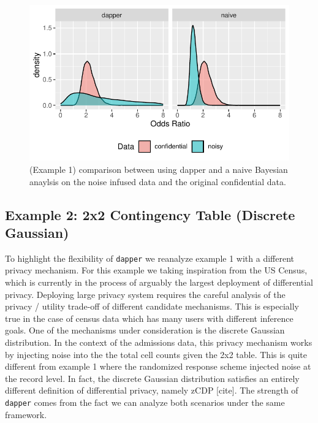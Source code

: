 \begin{figure}

{\centering \includegraphics{dppaper_files/figure-latex/post-or-compare-1} 

}

\caption{(Example 1) comparison between using dapper and a naive Bayesian anaylsis on the
noise infused data and the original confidential data.}\label{fig:post-or-compare}
\end{figure}

\hypertarget{example-2-2x2-contingency-table-discrete-gaussian}{%
\subsection{Example 2: 2x2 Contingency Table (Discrete Gaussian)}\label{example-2-2x2-contingency-table-discrete-gaussian}}

To highlight the flexibility of \texttt{dapper} we reanalyze example 1
with a different privacy mechanism. For this example we taking inspiration from the US Census,
which is currently in the process of arguably the largest deployment of differential privacy.
Deploying large privacy system requires the careful analysis
of the privacy / utility trade-off of different candidate mechanisms. This is especially
true in the case of census data which has many users with different inference goals.
One of the mechanisms under consideration is the discrete Gaussian distribution.
In the context of the admissions data, this privacy mechanism works by injecting
noise into the the total cell counts given the 2x2 table. This is quite different from
example 1 where the randomized response scheme injected noise at the record level.
In fact, the discrete Gaussian distribution satisfies an entirely different
definition of differential privacy, namely zCDP {[}cite{]}.
The strength of \texttt{dapper} comes from the fact we can analyze both scenarios under the
same framework.

